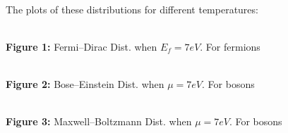 \documentclass[a4paper,12pt]{article}
\begin{document}
\paragraph{}The plots of these distributions for different temperatures:
\begin{center}
    \\
    \textbf{Figure 1:} Fermi--Dirac Dist. when $E_f=7eV$. For fermions\\
\end{center}
\par
\begin{center}
    \\
    \textbf{Figure 2:} Bose--Einstein Dist. when $\mu=7eV$. For bosons\\
\end{center}
\begin{center}
    \\
    \textbf{Figure 3:} Maxwell--Boltzmann Dist. when $\mu=7eV$. For bosons\\
\end{center}
\end{document}
